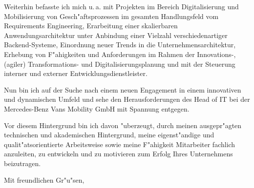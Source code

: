 \documentclass[11pt,a4paper]{dinbrief}
\begin{document}
\begin{letter}
Weiterhin befasste ich mich u.\,a. mit Projekten im Bereich Digitalisierung und Mobilisierung von Gesch"aftsprozessen im gesamten Handlungsfeld vom Requirements Engineering, Erarbeitung einer skalierbaren Anwendungsarchitektur unter Anbindung einer Vielzahl verschiedenartiger Backend-Systeme, Einordnung neuer Trends in die Unternehmensarchitektur, Erhebung von F"ahigkeiten und Anforderungen im Rahmen der Innovations-, (agiler) Transformations- und Digitalisierungsplanung und mit der Steuerung interner und externer Entwicklungsdienstleister. 

Nun bin ich auf der Suche nach einem neuen Engagement in einem innovativen und dynamischen Umfeld und sehe den Herausforderungen des Head of IT bei der Mercedes-Benz Vans Mobility GmbH mit Spannung entgegen.

Vor diesem Hintergrund bin ich davon "uberzeugt, durch meinen ausgepr"agten technischen und akademischen Hintergrund, meine eigenst"andige und qualit"atsorientierte Arbeitsweise sowie meine F"ahigkeit Mitarbeiter fachlich anzuleiten, zu entwickeln und zu motivieren zum Erfolg Ihres Unternehmens beizutragen.

\closing{Mit freundlichen Gr"u"sen,}
\end{letter}
\end{document}
